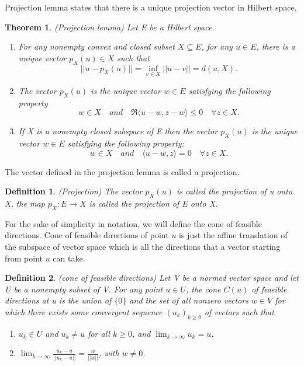 \documentclass[a4paper]{report}
\newtheorem{theorem}{Theorem}[section]
\newtheorem{definition}{Definition}[section]
\begin{document}
Projection lemma states that there is a unique projection vector in Hilbert space.

\begin{theorem}
    (Projection lemma\cite{gallier2019algebra}) Let E be a Hilbert space.
    \begin{enumerate}[label={(\arabic*)}]
        \item For any nonempty convex and closed subset $X\subseteq E$, for any $u\in E$, there is a unique vector $p_X(u)\in X$ such that
            \[
                ||u-p_X(u)||=\inf_{v\in X} ||u-v||=d(u,X).
            \]
        \item The vector $p_X(u)$ is the unique vector $w\in E$ satisfying the following property
            \[
                w\in X \quad and \quad \mathfrak R \langle u-w,z-w \rangle \leq 0 \quad \forall z\in X.
            \]
        \item If X is a nonempty closed subspace of E then the vector $p_X(u)$ is the unique vector $w\in E$ satisfying the following property:
            \[
                w\in X \quad and \quad \langle u-w, z \rangle = 0 \quad \forall z\in X.
            \]
    \end{enumerate}
\end{theorem}

The vector defined in the projection lemma is called a projection.

\begin{definition}
    (Projection\cite{gallier2019algebra}) The vector $p_X(u)$ is called the projection of u onto X, the map $p_X:E\to X$ is called the projection of E onto X.
\end{definition}

For the sake of simplicity in notation, we will define the cone of feasible directions. Cone of feasible directions of point $u$ is just the affine translation of the subspace of vector space which is all the directions that a vector starting from point $u$ can take.

\begin{definition}
    (cone of feasible directions\cite{gallier2019algebra}) Let V be a normed vector space and let U be a nonempty subset of V. For any point $u\in U$, the cone $C(u)$ of feasible directions at u is the union of $\{0\}$ and the set of all nonzero vectors $w\in V$ for which there exists some convergent sequence $(u_k)_{k\geq 0}$ of vectors such that
    \begin{enumerate}[label={(\arabic*)}]
        \item $u_k\in U$ and $u_k\neq u$ for all $k\geq 0$, and $\lim_{k\to \infty} u_k = u$.
        \item $\lim_{k\to\infty} \frac{u_k-u}{||u_k-u||} = \frac{w}{||w||}$, with $w\neq 0$.
    \end{enumerate}
\end{definition}
\end{document}
